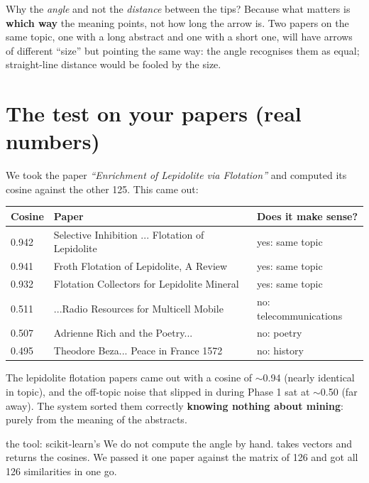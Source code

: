 \documentclass[11pt,a4paper]{article}
\begin{document}
\begin{ojo}
Why the \emph{angle} and not the \emph{distance} between the tips? Because what matters is
\textbf{which way} the meaning points, not how long the arrow is. Two papers on the same
topic, one with a long abstract and one with a short one, will have arrows of different
``size'' but pointing the same way: the angle recognises them as equal; straight-line
distance would be fooled by the size.
\end{ojo}

\section{The test on your papers (real numbers)}

We took the paper \emph{``Enrichment of Lepidolite via Flotation''} and computed its cosine
against the other 125. This came out:

\begin{center}
\begin{tabular}{lll}
\textbf{Cosine} & \textbf{Paper} & \textbf{Does it make sense?} \\
\hline
0.942 & Selective Inhibition ... Flotation of Lepidolite & yes: same topic \\
0.941 & Froth Flotation of Lepidolite, A Review & yes: same topic \\
0.932 & Flotation Collectors for Lepidolite Mineral & yes: same topic \\
\hline
0.511 & ...Radio Resources for Multicell Mobile & no: telecommunications \\
0.507 & Adrienne Rich and the Poetry... & no: poetry \\
0.495 & Theodore Beza... Peace in France 1572 & no: history \\
\end{tabular}
\end{center}

The lepidolite flotation papers came out with a cosine of $\sim$0.94 (nearly identical in
topic), and the off-topic noise that slipped in during Phase 1 sat at $\sim$0.50 (far away).
The system sorted them correctly \textbf{knowing nothing about mining}: purely from the
meaning of the abstracts.

\begin{concepto}{the tool: scikit-learn's }
We do not compute the angle by hand.
 takes vectors and returns the cosines.
We passed it one paper against the matrix of 126 and got all 126 similarities in one go.
\end{concepto}
\end{document}

